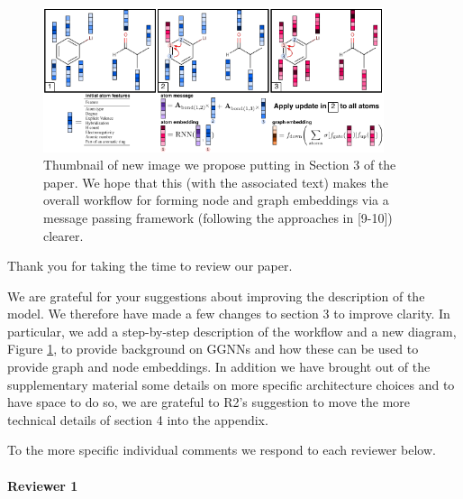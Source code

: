\documentclass{article}
\begin{document}


\begin{figure}
\centering
  \includegraphics[width=10cm]{graph_nn.pdf}
 \caption{Thumbnail of new image we propose  putting in Section 3 of the paper. We hope that this (with the associated text) makes the overall workflow for forming node and graph embeddings via a message passing framework (following the approaches in [9-10]) clearer.}
 \label{fig:new-diagram}
\end{figure}

Thank you for taking the time to review our paper. 

We are grateful for your suggestions about improving the description of the model. We therefore have made a few changes to section 3 to improve clarity.
In particular, we add a step-by-step description of the workflow and a new diagram, Figure \ref{fig:new-diagram}, to provide background on GGNNs and how these can be used to provide graph and node embeddings. 
In addition we have brought out of the supplementary material some details on more specific architecture choices and to have space to do so, we are grateful to R2's suggestion to move the more technical details of section 4 into the appendix.

To the more specific individual comments we respond to each reviewer below.


\paragraph{Reviewer 1}
\end{document}
